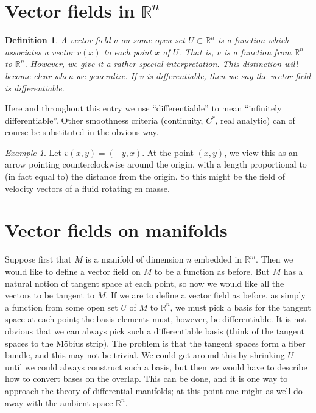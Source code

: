 \documentclass[12pt]{article}
\newtheorem*{defn}{Definition}
\theoremstyle{remark}
\newtheorem*{example}{Example}
\begin{document}
\section*{Vector fields in $\mathbb{R}^n$}

\begin{defn}
A \emph{vector field} $v$ on some open set $U \subset \mathbb{R}^n$ is a function which associates a vector $v(x)$ to each point $x$ of $U$. That is, $v$ is a function from $\mathbb{R}^n$ to $\mathbb{R}^n$.  However, we give it a rather special interpretation.  This distinction will become clear when we generalize.  If $v$ is differentiable, then we say the vector field is \emph{differentiable}.
\end{defn}

Here and throughout this entry we use ``differentiable'' to mean ``infinitely differentiable''.  Other smoothness criteria (continuity, $C^r$, real analytic) can of course be substituted in the obvious way.

\begin{example}
Let $v(x,y)=(-y,x)$.  At the point $(x,y)$, we view this as an arrow pointing counterclockwise around the origin, with a length proportional to (in fact equal to) the distance from the origin.  So this might be the field of velocity vectors of a fluid rotating en masse.
\end{example}

\section*{Vector fields on manifolds}

Suppose first that $M$ is a manifold of dimension $n$ embedded in $\mathbb{R}^m$.  Then we would like to define a vector field on $M$ to be a function as before.  But $M$ has a natural notion of tangent space at each point, so now we would like all the vectors to be tangent to $M$.  If we are to define a vector field as before, as simply a function from some open set $U$ of $M$ to $\mathbb{R}^n$, we must pick a basis for the tangent space at each point; the basis elements must, however, be differentiable.  It is not obvious that we can always pick such a differentiable basis (think of the tangent spaces to the M\"obius strip).  The problem is that the tangent spaces form a fiber bundle, and this may not be trivial.  We could get around this by shrinking $U$ until we could always construct such a basis, but then we would have to describe how to convert bases on the overlap.  This can be done, and it is one way to approach the theory of differential manifolds; at this point one might as well do away with the ambient space $\mathbb{R}^n$.
\end{document}
